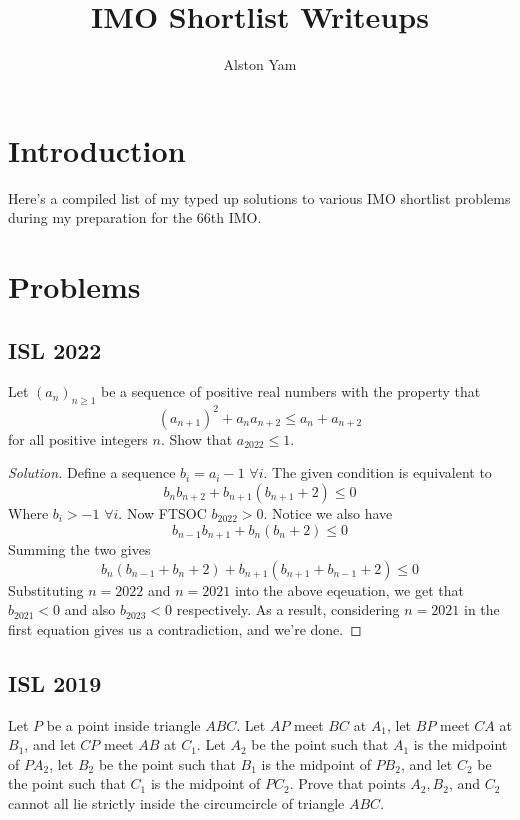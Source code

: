 \documentclass{article}
\title{IMO Shortlist Writeups}
\author{Alston Yam}
\theoremstyle{mytheoremstyle}
\theoremstyle{mytheoremstyle}
\theoremstyle{myproblemstyle}
\begin{document}
    \maketitle
    \section{Introduction}
    Here's a compiled list of my typed up solutions to various IMO shortlist problems during my preparation for the 66th IMO.
    
    \section{Problems}
    \subsection{ISL 2022}

    \begin{problem}[2022 A1]
        Let $(a_n)_{n\geq 1}$ be a sequence of positive real numbers with the property that
            \[ (a_{n+1})^2 + a_na_{n+2} \leq a_n + a_{n+2} \]
        for all positive integers $n$. Show that $a_{2022}\leq 1$.
    \end{problem}

    \begin{proof}[Solution]
        Define a sequence $b_i = a_i - 1$ $\forall i$. The given condition is equivalent to \[b_nb_{n+2} + b_{n+1}(b_{n+1} + 2) \leq 0\]
        Where $b_i > -1$ $\forall i$. Now FTSOC $b_{2022} > 0$. Notice we also have \[b_{n-1}b_{n+1} + b_{n}(b_{n} + 2) \leq 0\]
        Summing the two gives
        \[b_n(b_{n-1} + b_n + 2) + b_{n+1}(b_{n+1} + b_{n-1} + 2)\leq 0\]
        Substituting $n=2022$ and $n=2021$ into the above eqeuation, we get that $b_{2021} < 0$ and also $b_{2023} < 0$ respectively. As a result, considering $n=2021$ in the first equation gives us a contradiction, and we're done.
    \end{proof}

    \subsection{ISL 2019}

    \begin{problem}[2019 G4]
        Let $P$ be a point inside triangle $ABC$. Let $AP$ meet $BC$ at $A_1$, let $BP$ meet $CA$ at $B_1$, and let $CP$ meet $AB$ at $C_1$. Let $A_2$ be the point such that $A_1$ is the midpoint of $PA_2$, let $B_2$ be the point such that $B_1$ is the midpoint of $PB_2$, and let $C_2$ be the point such that $C_1$ is the midpoint of $PC_2$. Prove that points $A_2, B_2$, and $C_2$ cannot all lie strictly inside the circumcircle of triangle $ABC$.
    \end{problem}
\end{document}
